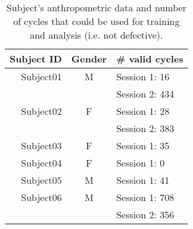 \begin{table}[ht!]
    \centering
    \caption{Subject's anthropometric data and number of cycles that could be used for training and analysis (i.e. not defective).}
    \label{tab:subject-table}
    \small
    \begin{tabular}{r | c | l}
        \textbf{Subject ID} & \textbf{Gender}   & \textbf{\# valid cycles}\\ \hline
        Subject01           & M                 & Session 1: 16 \\
                            &                   & Session 2: 434 \\ \hline
        Subject02           & F                 & Session 1: 28 \\
                            &                   & Session 2: 383 \\ \hline
        Subject03           & F                 & Session 1: 35 \\ \hline
        Subject04           & F                 & Session 1: 0 \\ \hline
        Subject05           & M                 & Session 1: 41 \\ \hline
        Subject06           & M                 & Session 1: 708 \\
                            &                   & Session 2: 356 \\ \hline
    \end{tabular}
\end{table}